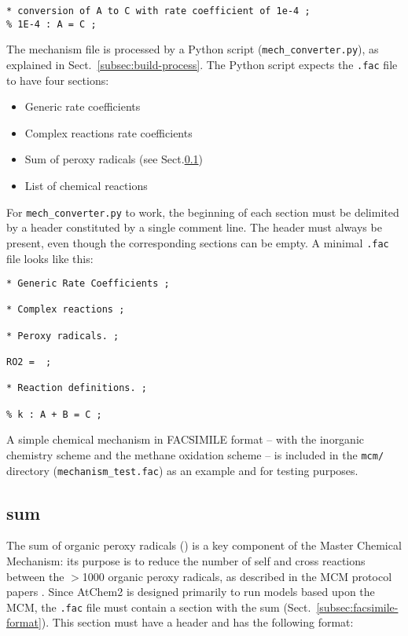 \begin{verbatim}
* conversion of A to C with rate coefficient of 1e-4 ;
% 1E-4 : A = C ;
\end{verbatim}

The mechanism file is processed by a Python script (\texttt{mech\_converter.py}),
as explained in Sect.~\ref{subsec:build-process}. The Python script
expects the \texttt{.fac} file to have four sections:

\begin{itemize}
\item Generic rate coefficients
\item Complex reactions rate coefficients
\item Sum of peroxy radicals (see Sect.\ref{subsec:ro2-sum})
\item List of chemical reactions
\end{itemize}

For \texttt{mech\_converter.py} to work, the beginning of each section
must be delimited by a header constituted by a single comment line.
The header must always be present, even though the corresponding
sections can be empty. A minimal \texttt{.fac} file looks like this:

\begin{verbatim}
* Generic Rate Coefficients ;

* Complex reactions ;

* Peroxy radicals. ;

RO2 =  ;

* Reaction definitions. ;

% k : A + B = C ;
\end{verbatim}

A simple chemical mechanism in FACSIMILE format -- with the inorganic
chemistry scheme and the methane oxidation scheme -- is included in
the \texttt{mcm/} directory (\texttt{mechanism\_test.fac}) as an
example and for testing purposes.

\subsection{ sum} \label{subsec:ro2-sum}

The sum of organic peroxy radicals () is a key component of
the Master Chemical Mechanism: its purpose is to reduce the number of
self and cross reactions between the $>$1000 organic peroxy radicals,
as described in the MCM protocol papers \citep{Jenkin_1997,
  Saunders_2003}. Since AtChem2 is designed primarily to run models
based upon the MCM, the \texttt{.fac} file must contain a section with
the  sum (Sect.~\ref{subsec:facsimile-format}). This section
must have a header and has the following format:

